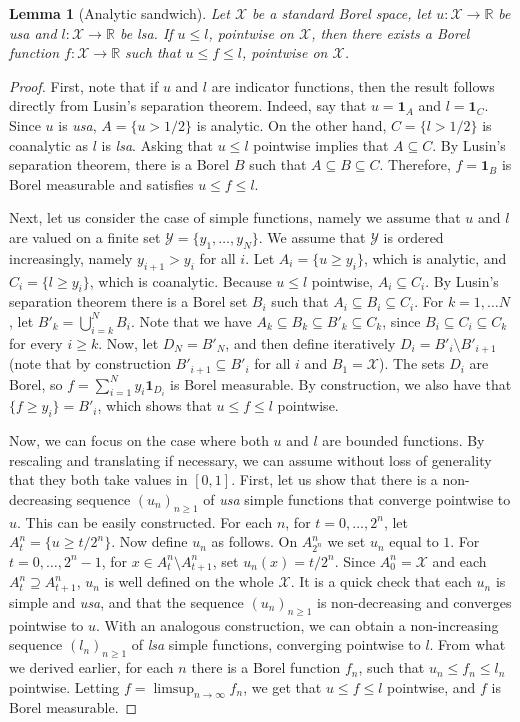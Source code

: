 \documentclass[10pt, a4paper]{article}
\newcommand{\lsa}{\emph{lsa}\xspace}
\newcommand{\R}{\mathbb R}
\newcommand{\usa}{\emph{usa}\xspace}
\newcommand{\X}{\mathcal X}
\newtheorem{lemma}{Lemma}
\begin{document}
\begin{lemma}[Analytic sandwich]\label{lemma:sandwich}
Let $\X$ be a standard Borel space, let $u:\X\to\R$ be \usa and $l:\X\to\R$ be \lsa. If $u\leq l$, pointwise on $\X$, then there exists a Borel function $f:\X\to\R$ such that $u\leq f\leq l$, pointwise on $\X$.
\end{lemma}

\begin{proof}
First, note that if $u$ and $l$ are indicator functions, then the result follows directly from Lusin's separation theorem. Indeed, say that $u = \mathbf{1}_A$ and $l = \mathbf{1}_C$. Since $u$ is \usa,  $A = \{u>1/2\}$ is analytic. On the other hand, $C = \{ l > 1/2 \}$ is coanalytic as $l$ is \lsa. Asking that $u\leq l$ pointwise implies that $A\subseteq C$. By Lusin's separation theorem, there is a Borel $B$ such that $A\subseteq B\subseteq C$. Therefore, $f = \mathbf{1}_B$ is Borel measurable and satisfies $u\leq f\leq l$.

Next, let us consider the case of simple functions, namely we assume that $u$ and $l$ are valued on a finite set $\mathcal Y = \{y_1,\dots,y_N\}$. We assume that $\mathcal Y$ is ordered increasingly, namely $y_{i+1}>y_i$ for all $i$. Let $A_i = \{u\geq y_i\}$, which is analytic, and $C_i = \{l\geq y_i\}$, which is coanalytic. Because $u\leq l$ pointwise, $A_i\subseteq C_i$. By Lusin's separation theorem there is a Borel set $B_i$ such that $A_i\subseteq B_i\subseteq C_i$. For $k=1,\dots N$, let $B'_k = \bigcup_{i=k}^N B_i$. Note that we have $A_k \subseteq B_k\subseteq B'_k\subseteq  C_k$, since $B_i\subseteq C_i\subseteq C_k$ for every $i\geq k$. Now, let $D_N = B'_N$, and then define iteratively $D_i = B'_i\setminus B'_{i+1}$ (note that by construction $B'_{i+1}\subseteq B'_i$ for all $i$ and $B_1=\X$). The sets $D_i$ are Borel, so $f = \sum_{i=1}^N y_i\mathbf{1}_{D_i}$ is Borel measurable. By construction, we also have that $\{f\geq y_i\}=B'_i$, which shows that $u\leq f\leq l$ pointwise.

Now, we can focus on the case where both $u$ and $l$ are bounded functions. By rescaling and translating if necessary, we can assume without loss of generality that they both take values in $[0,1]$. First, let us show that there is a non-decreasing sequence $(u_n)_{n\geq 1}$ of \usa simple functions that converge pointwise to $u$. This can be easily constructed. For each $n$, for $t=0,\dots,2^n$, let $A_t^n = \{u\geq t/2^n\}$. Now define $u_n$ as follows. On $A_{2^n}^n$ we set $u_n$ equal to $1$. For $t = 0,\dots,2^n-1$, for $x\in A_t^n\setminus A_{t+1}^n$, set $u_n(x) = t/2^n$. Since $A_0^n = \mathcal X$ and each $A_t^n\supseteq A_{t+1}^n$, $u_n$ is well defined on the whole $\mathcal X$. It is a quick check that each $u_n$ is simple and \usa, and that the sequence $(u_n)_{n\geq 1}$ is non-decreasing and converges pointwise to $u$. With an analogous construction, we can obtain a non-increasing sequence $(l_n)_{n\geq1}$ of \lsa simple functions, converging pointwise to $l$. From what we derived earlier, for each $n$ there is a Borel function $f_n$, such that $u_n\leq f_n\leq l_n$ pointwise. Letting $f=\limsup_{n\to\infty} f_n$, we get that $u\leq f\leq l$ pointwise, and $f$ is Borel measurable.


\end{proof}
\end{document}
